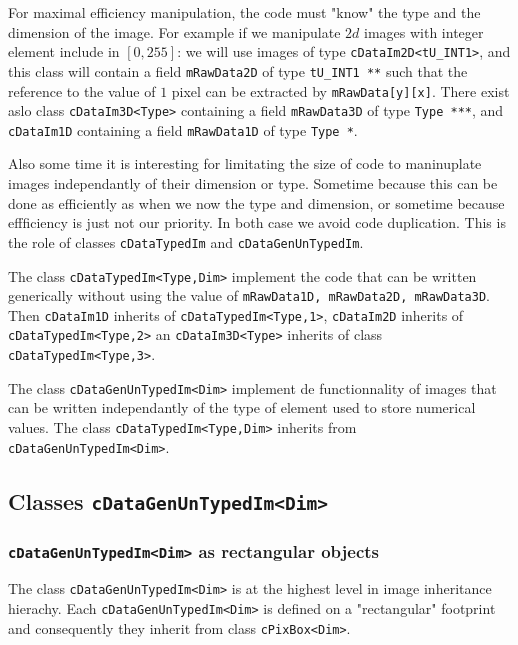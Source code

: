 For maximal efficiency manipulation, the code must "know" the type and the dimension
of the image.  For example if we manipulate $2d$ images with integer element 
include in $[0,255]$:  we will use images of type {\tt cDataIm2D<tU\_INT1>},
and this class will contain a field {\tt mRawData2D} of type {\tt tU\_INT1 **}
such that the reference to the value of $1$ pixel can be extracted by   {\tt mRawData[y][x]}.
There exist aslo class {\tt cDataIm3D<Type>} containing a field {\tt mRawData3D} of type {\tt Type ***},
 and {\tt cDataIm1D} containing a field {\tt mRawData1D} of type {\tt Type *}.

Also some time it is interesting for limitating the size of code to maninuplate  images
independantly of their dimension or type. Sometime because this can be done as efficiently
as when we now the type and dimension, or sometime because effficiency is just not our priority. In
both case we avoid code duplication. This is the role of classes {\tt cDataTypedIm} and {\tt cDataGenUnTypedIm}.


The class {\tt cDataTypedIm<Type,Dim>} implement the code that can be written generically without using
the value of {\tt mRawData1D, mRawData2D, mRawData3D}.  Then {\tt cDataIm1D} inherits of {\tt cDataTypedIm<Type,1>},
{\tt cDataIm2D} inherits of {\tt cDataTypedIm<Type,2>} an {\tt cDataIm3D<Type>} inherits of class {\tt cDataTypedIm<Type,3>}.


The class  {\tt cDataGenUnTypedIm<Dim>} implement de  functionnality of images that can be written
independantly of the type of element used to store numerical values. The class {\tt cDataTypedIm<Type,Dim>}
inherits from {\tt cDataGenUnTypedIm<Dim>}.



\subsection{Classes {\tt cDataGenUnTypedIm<Dim>}}



\subsubsection{{\tt cDataGenUnTypedIm<Dim>} as rectangular objects }

The class {\tt cDataGenUnTypedIm<Dim>} is at the highest level in image  inheritance
hierachy.  Each {\tt cDataGenUnTypedIm<Dim>} is defined on a "rectangular" footprint
and consequently they inherit from class {\tt cPixBox<Dim>}. 


